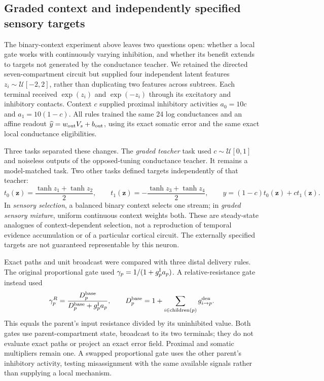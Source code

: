 \subsection{Graded context and independently specified sensory targets}
\label{sec:gate_generalization}

The binary-context experiment above leaves two questions open: whether a local
gate works with continuously varying inhibition, and whether its benefit extends
to targets not generated by the conductance teacher. We retained the directed
seven-compartment circuit but supplied four independent latent features
$z_i\sim\mathcal U[-2,2]$, rather than duplicating two features across subtrees.
Each terminal received $\exp(z_i)$ and $\exp(-z_i)$ through its excitatory and
inhibitory contacts. Context $c$ supplied proximal inhibitory activities
$a_0=10c$ and $a_1=10(1-c)$. All rules trained the same 24 log conductances
and an affine readout $\widehat y=w_{\rm out}V_s+b_{\rm out}$, using its exact
somatic error and the same exact local conductance eligibilities.

Three tasks separated these changes. The \emph{graded teacher} task used
$c\sim\mathcal U[0,1]$ and noiseless outputs of the opposed-tuning conductance
teacher. It remains a model-matched task. Two other tasks defined targets
independently of that teacher:
\begin{equation}
t_0(\bm z)=\frac{\tanh z_1+\tanh z_2}{2},\qquad
t_1(\bm z)=-\frac{\tanh z_3+\tanh z_4}{2},\qquad
y=(1-c)t_0(\bm z)+ct_1(\bm z).
\end{equation}
In \emph{sensory selection}, a balanced binary context selects one stream;
in \emph{graded sensory mixture}, uniform continuous context weights both.
These are steady-state analogues of context-dependent selection, not a
reproduction of temporal evidence accumulation or of a particular cortical
circuit. The externally specified targets are not guaranteed representable by
this neuron.

Exact paths and unit broadcast were compared with three distal delivery rules.
The original proportional gate used $\gamma_p=1/(1+g_p^{\rm I}a_p)$.
A relative-resistance gate instead used
\begin{equation}
\gamma_p^{R}=\frac{D_p^{\rm base}}{D_p^{\rm base}+g_p^{\rm I}a_p},\qquad
D_p^{\rm base}=1+\sum_{i\in\operatorname{children}(p)}g_{i\to p}^{\rm den}.
\end{equation}
This equals the parent's input resistance divided by its uninhibited value.
Both gates use parent-compartment state, broadcast to its two terminals;
they do not evaluate exact paths or project an exact error field.
Proximal and somatic multipliers remain one. A swapped proportional gate
uses the other parent's inhibitory activity, testing misassignment with the
same available signals rather than supplying a local mechanism.


